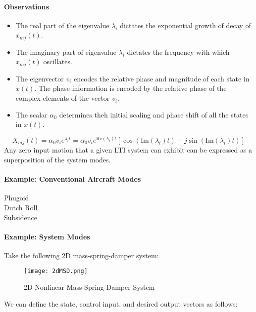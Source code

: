 \documentclass[../notes.tex]{subfiles}
\begin{document}
\paragraph{Observations}
\begin{itemize}
    \item The real part of the eigenvalue $\lambda_i$ dictates the exponential growth of decay of $x_{mj}(t)$.
    \item The imaginary part of eigenvalue $\lambda_i$ dictates the frequency with which $x_{mj}(t)$ oscillates.
    \item The eigenvector $v_i$ encodes the relative phase and magnitude of each state in $x(t)$. The phase information is encoded by the relative phase of the complex elements of the vector $v_i$.
    \item The scalar $\alpha_0$ determines theh initial scaling and phase shift of all the states in $x(t)$.
\end{itemize}
\begin{equation*}
    X_{mj}(t) = \alpha_0 v_i e^{\lambda_i t} = \alpha_0 v_i e^{\text{Re}(\lambda_i)t}[\cos(\text{Im}(\lambda_i)t) + j\sin(\text{Im}(\lambda_i)t)]
\end{equation*}
Any zero input motion that a given LTI system can exhibit can be expressed as a superposition of the system modes.

\paragraph{Example: Conventional Aircraft Modes}
\begin{description}
    \item[Phugoid]
    \item[Dutch Roll]
    \item[Subsidence]   
\end{description}

\paragraph{Example: System Modes}
Take the following 2D mass-spring-damper system:
\begin{figure}[H]
    \centering
    \texttt{[image: 2dMSD.png]}
    \caption{2D Nonlinear Mass-Spring-Damper System}
    \label{fig:3MSD}
\end{figure}
We can define the state, control input, and desired output vectors as follows:
\end{document}
